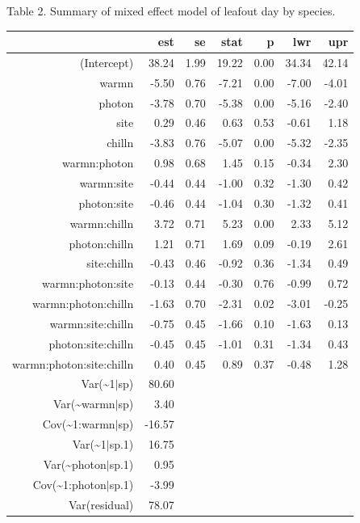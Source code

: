 \documentclass[11pt]{article}
\begin{document}
Table 2. Summary of mixed effect model of leafout day by species.

\begin{table}[ht]
\centering
\begin{tabular}{rrrrrrr}
  \hline
 & est & se & stat & p & lwr & upr \\ 
  \hline
(Intercept) & 38.24 & 1.99 & 19.22 & 0.00 & 34.34 & 42.14 \\ 
  warmn & -5.50 & 0.76 & -7.21 & 0.00 & -7.00 & -4.01 \\ 
  photon & -3.78 & 0.70 & -5.38 & 0.00 & -5.16 & -2.40 \\ 
  site & 0.29 & 0.46 & 0.63 & 0.53 & -0.61 & 1.18 \\ 
  chilln & -3.83 & 0.76 & -5.07 & 0.00 & -5.32 & -2.35 \\ 
  warmn:photon & 0.98 & 0.68 & 1.45 & 0.15 & -0.34 & 2.30 \\ 
  warmn:site & -0.44 & 0.44 & -1.00 & 0.32 & -1.30 & 0.42 \\ 
  photon:site & -0.46 & 0.44 & -1.04 & 0.30 & -1.32 & 0.41 \\ 
  warmn:chilln & 3.72 & 0.71 & 5.23 & 0.00 & 2.33 & 5.12 \\ 
  photon:chilln & 1.21 & 0.71 & 1.69 & 0.09 & -0.19 & 2.61 \\ 
  site:chilln & -0.43 & 0.46 & -0.92 & 0.36 & -1.34 & 0.49 \\ 
  warmn:photon:site & -0.13 & 0.44 & -0.30 & 0.76 & -0.99 & 0.72 \\ 
  warmn:photon:chilln & -1.63 & 0.70 & -2.31 & 0.02 & -3.01 & -0.25 \\ 
  warmn:site:chilln & -0.75 & 0.45 & -1.66 & 0.10 & -1.63 & 0.13 \\ 
  photon:site:chilln & -0.45 & 0.45 & -1.01 & 0.31 & -1.34 & 0.43 \\ 
  warmn:photon:site:chilln & 0.40 & 0.45 & 0.89 & 0.37 & -0.48 & 1.28 \\ 
           Var(\~{}1$|$sp) & 80.60 &  &  &  &  &  \\ 
       Var(\~{}warmn$|$sp) & 3.40 &  &  &  &  &  \\ 
     Cov(\~{}1:warmn$|$sp) & -16.57 &  &  &  &  &  \\ 
         Var(\~{}1$|$sp.1) & 16.75 &  &  &  &  &  \\ 
    Var(\~{}photon$|$sp.1) & 0.95 &  &  &  &  &  \\ 
  Cov(\~{}1:photon$|$sp.1) & -3.99 &  &  &  &  &  \\ 
        Var(residual) & 78.07 &  &  &  &  &  \\ 
   \hline
\end{tabular}
\end{table}
\end{document}
